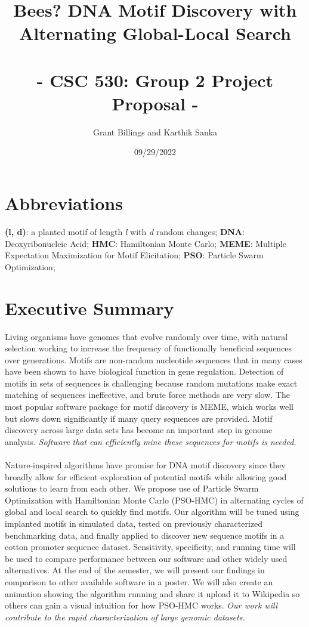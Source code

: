 \documentclass{article}
\title{%
	\Large Bees? DNA Motif Discovery with Alternating Global-Local Search  \\
	\large \; \\ - CSC 530: Group 2 Project Proposal -}
\author{Grant Billings and Karthik Sanka}
\date{09/29/2022}
\begin{document}
\maketitle
\section*{\large{Abbreviations}}
\textbf{(l, d)}: a planted motif of length \textit{l} with \textit{d} random changes; \textbf{DNA}: Deoxyribonucleic Acid; \textbf{HMC}: Hamiltonian Monte Carlo; \textbf{MEME}: Multiple Expectation Maximization for Motif Elicitation; \textbf{PSO}: Particle Swarm Optimization;
\section{Executive Summary}
Living organisms have genomes that evolve randomly over time, with natural selection working to increase the frequency of functionally beneficial sequences over generations. Motifs are non-random nucleotide sequences that in many cases have been shown to have biological function in gene regulation. Detection of motifs in sets of sequences is challenging because random mutations make exact matching of sequences ineffective, and brute force methods are very slow. The most popular software package for motif discovery is MEME, which works well but slows down significantly if many query sequences are provided. Motif discovery across large data sets has become an important step in genome analysis. \textit{Software that can efficiently mine these sequences for motifs is needed.}  \\\\
Nature-inspired algorithms have promise for DNA motif discovery since they broadly allow for efficient exploration of potential motifs while allowing good solutions to learn from each other. We propose use of Particle Swarm Optimization with Hamiltonian Monte Carlo (PSO-HMC) in alternating cycles of global and local search to quickly find motifs. Our algorithm will be tuned using implanted motifs in simulated data, tested on previously characterized benchmarking data, and finally applied to discover new sequence motifs in a cotton promoter sequence dataset. Sensitivity, specificity, and running time will be used to compare performance between our software and other widely used alternatives. At the end of the semester, we will present our findings in comparison to other available software in a poster. We will also create an animation showing the algorithm running and share it upload it to Wikipedia so others can gain a visual intuition for how PSO-HMC works. \textit{Our work will contribute to the rapid characterization of large genomic datasets.}
\end{document}
